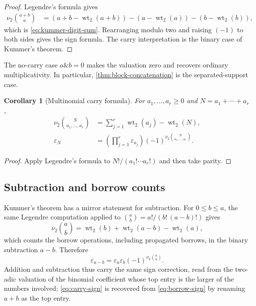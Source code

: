 \documentclass[11pt,oneside]{article}
\numberwithin{equation}{section}
\newtheorem{corollary}[theorem]{Corollary}
\theoremstyle{definition}
\theoremstyle{remark}
\newcommand{\wt}{\operatorname{wt}_2}
\newcommand{\vtwo}{\nu_2}
\newcommand{\eps}{\varepsilon}
\begin{document}
\begin{proof}
Legendre's formula gives
\begin{align*}
 \vtwo\binom{a+b}{a}
 &=(a+b-\wt(a+b))-(a-\wt(a))-(b-\wt(b)),
\end{align*}
which is \eqref{eq:kummer-digit-sum}.  Rearranging modulo two and raising
\((-1)\) to both sides gives the sign formula.  The carry interpretation is
the binary case of Kummer's theorem.
\end{proof}

The no-carry case \(a\mathbin{\&}b=0\) makes the valuation zero and recovers
ordinary multiplicativity.  In particular, \cref{thm:block-concatenation} is
the separated-support case.

\begin{corollary}[Multinomial carry formula]
\label{cor:multinomial-carry}
For \(a_1,\ldots,a_r\ge0\) and \(N=a_1+\cdots+a_r\),
\begin{align}
 \vtwo\binom{N}{a_1,\ldots,a_r}
 &=\sum_{j=1}^{r}\wt(a_j)-\wt(N),
 \label{eq:multinomial-v2}\\
 \eps_N
 &=\left(\prod_{j=1}^{r}\eps_{a_j}\right)
   (-1)^{\vtwo\binom{N}{a_1,\ldots,a_r}}.
 \label{eq:multinomial-carry-sign}
\end{align}
\end{corollary}

\begin{proof}
Apply Legendre's formula to
\(N!/(a_1!\cdots a_r!)\) and then take parity.
\end{proof}

\subsection{Subtraction and borrow counts}

Kummer's theorem has a mirror statement for subtraction.  For
\(0\le b\le a\), the same Legendre computation applied to
\(\binom ab=a!/(b!\,(a-b)!)\) gives
\begin{equation}
  \vtwo\binom ab=\wt(b)+\wt(a-b)-\wt(a),
  \label{eq:borrow-count}
\end{equation}
which counts the borrow operations, including propagated borrows, in the
binary subtraction \(a-b\).  Therefore
\begin{equation}
  \boxed{
  \eps_{a-b}=\eps_a\eps_b(-1)^{\vtwo\binom ab}.}
  \label{eq:borrow-sign}
\end{equation}
Addition and subtraction thus carry the same sign correction, read from the
two-adic valuation of the binomial coefficient whose top entry is the larger
of the numbers involved; \eqref{eq:carry-sign} is recovered from
\eqref{eq:borrow-sign} by renaming \(a+b\) as the top entry.
\end{document}
